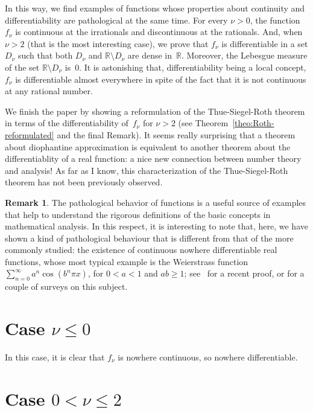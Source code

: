 \documentclass[11pt,a4paper,reqno]{amsart}
\def\R{\mathbb{R}}
\theoremstyle{plain}
\theoremstyle{definition}
\newtheorem{remark}{Remark}
\begin{document}
In this way, we find examples of functions whose properties about continuity and differentiability are pathological at the same time. 
For every $\nu > 0$, the function $f_\nu$ is continuous at the irrationals and discontinuous at the rationals. And, when $\nu > 2$ (that is the most interesting case), we prove that $f_\nu$ is differentiable in a set $D_\nu$ such that both $D_\nu$ and $\R \setminus D_\nu$
are dense in~$\R$. Moreover, the Lebesgue measure of the set $\R \setminus D_\nu$ is~$0$.
It is astonishing that, differentiability being a local concept, $f_\nu$ is differentiable almost everywhere in spite of the fact that it is not continuous at any rational number.

We finish the paper by showing a reformulation of the Thue-Siegel-Roth theorem in terms of the differentiability of~$f_\nu$ for $\nu > 2$ (see Theorem~\ref{theo:Roth-reformulated} and the final Remark). It seems really surprising that a theorem about diophantine approximation is equivalent to another theorem about the differentiablity of a real function: a nice new connection between number theory and analysis! As far as I know, this characterization of the Thue-Siegel-Roth theorem has not been previously observed.

\begin{remark}
The pathological behavior of functions is a useful source of examples that help to understand the rigorous definitions of the basic concepts in mathematical analysis. In this respect, it is interesting to note that, here, we have shown
a kind of pathological behaviour that is different from that of the more commonly studied: the existence of continuous nowhere differentiable real functions, whose most typical example is the Weierstrass function $\sum_{n=0}^\infty a^n \cos(b^n \pi x)$, for $0 < a < 1$ and $ab \ge 1$; see~\cite{BaDu} for a recent proof, or \cite{Pinkus, Thim} for a couple of surveys on this subject.
\end{remark}

\section{Case $\nu \le 0$}

In this case, it is clear that $f_\nu$ is nowhere continuous, so nowhere differentiable.

\section{Case $0 < \nu \le 2$}
\end{document}
